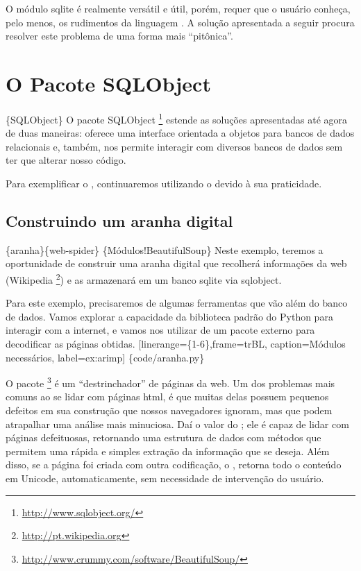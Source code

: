 \documentclass[a4paper,10pt,brazil]{sphinxmanual}
\begin{document}
O módulo sqlite é realmente versátil e útil, porém, requer que o
usuário conheça, pelo menos, os rudimentos da linguagem . A
solução apresentada a seguir procura resolver este problema de uma
forma mais ``pitônica''.


\chapter{O Pacote SQLObject}
\label{capbd:o-pacote-sqlobject}
\{SQLObject\} O pacote SQLObject \footnote{
\href{http://www.sqlobject.org/}{http://www.sqlobject.org/}
} estende as soluções
apresentadas até agora de duas maneiras: oferece uma interface
orientada a objetos para bancos de dados relacionais e, também, nos
permite interagir com diversos bancos de dados sem ter que alterar
nosso código.

Para exemplificar o , continuaremos utilizando o
 devido à sua praticidade.


\section{Construindo um aranha digital}
\label{capbd:construindo-um-aranha-digital}
\{aranha\}\{web-spider\} \{Módulos!BeautifulSoup\} Neste exemplo, teremos
a oportunidade de construir uma aranha digital que recolherá
informações da web (Wikipedia \footnote{
\href{http://pt.wikipedia.org}{http://pt.wikipedia.org}
}) e as armazenará em um banco
sqlite via sqlobject.

Para este exemplo, precisaremos de algumas ferramentas que vão além
do banco de dados. Vamos explorar a capacidade da biblioteca padrão
do Python para interagir com a internet, e vamos nos utilizar de um
pacote externo para decodificar as páginas obtidas.
{[}linerange=\{1-6\},frame=trBL, caption=Módulos necessários, label=ex:arimp{]} \{code/aranha.py\}

O pacote  \footnote{
\href{http://www.crummy.com/software/BeautifulSoup/}{http://www.crummy.com/software/BeautifulSoup/}
} é um ``destrinchador'' de páginas da
web. Um dos problemas mais comuns ao se lidar com páginas html, é
que muitas delas possuem pequenos defeitos em sua construção que
nossos navegadores ignoram, mas que podem atrapalhar uma análise
mais minuciosa. Daí o valor do ; ele é capaz de
lidar com páginas defeituosas, retornando uma estrutura de dados
com métodos que permitem uma rápida e simples extração da
informação que se deseja. Além disso, se a página foi criada com
outra codificação, o , retorna todo o conteúdo em
Unicode, automaticamente, sem necessidade de intervenção do
usuário.
\end{document}
